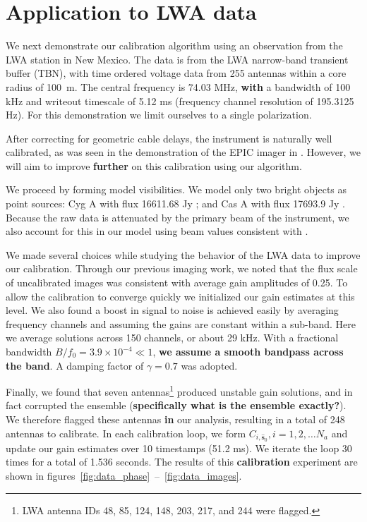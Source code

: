 \documentclass[a4paper,fleqn,usenatbib]{../mnras}
\begin{document}
\section{Application to LWA data}\label{sec:data}
We next demonstrate our calibration algorithm using an observation from the LWA station in New Mexico. The data is from the LWA narrow-band transient buffer (TBN), with time ordered voltage data from 255 antennas within a core radius of 100~m. The central frequency is 74.03 MHz, {\bf with} a bandwidth of 100 kHz and writeout timescale of 5.12 ms (frequency channel resolution of 195.3125 Hz). For this demonstration we limit ourselves to a single polarization.

After correcting for geometric cable delays, the instrument is naturally well calibrated, as was seen in the demonstration of the EPIC imager in \citealt{thy15c}. However, we will aim to improve {\bf further} on this calibration using our algorithm.

We proceed by forming model visibilities. We model only two bright objects as point sources: Cyg A with flux 16611.68 Jy \citep{coh07}; and Cas A with flux 17693.9 Jy \citep{kas07}. Because the raw data is attenuated by the primary beam of the instrument, we also account for this in our model using beam values consistent with \cite{hic12}.

We made several choices while studying the behavior of the LWA data to improve our calibration. Through our previous imaging work, we noted that the flux scale of uncalibrated images was consistent with average gain amplitudes of 0.25. To allow the calibration to converge quickly we initialized our gain estimates at this level. We also found a boost in signal to noise is achieved easily by averaging frequency channels and assuming the gains are constant within a sub-band. Here we average solutions across 150 channels, or about 29 kHz. With a fractional bandwidth $B/f_0 = 3.9 \times 10^{-4} \ll 1$, {\bf we assume a smooth bandpass across the band}. %
A damping factor of $\gamma = 0.7$ was adopted.

Finally, we found that seven antennas\footnote{LWA antenna IDs 48, 85, 124, 148, 203, 217, and 244 were flagged.} produced unstable gain solutions, and in fact corrupted the ensemble ({\bf specifically what is the ensemble exactly?}). We therefore flagged these antennas {\bf in} our analysis, resulting in a total of 248 antennas to calibrate. In each calibration loop, we form $C_{i,\hat{\boldsymbol{s}}_0}, i=1,2,\ldots N_a$ and update our gain estimates over 10 timestamps (51.2 ms). We iterate the loop 30 times for a total of 1.536 seconds. The results of this {\bf calibration} experiment are shown in figures~\ref{fig:data_phase}~--~\ref{fig:data_images}.
\end{document}
